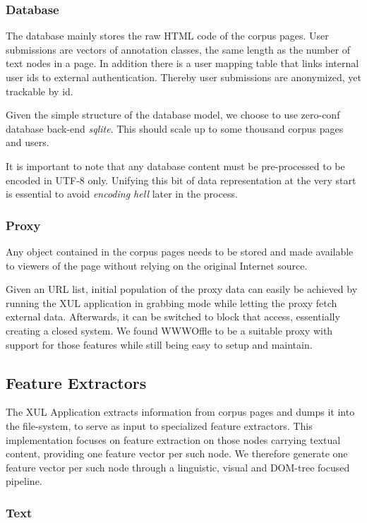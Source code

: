 \subsubsection{Database}

The database mainly stores the raw HTML code of the corpus pages.
User submissions are vectors of annotation classes, the same length as the number of text nodes in a page.
In addition there is a user mapping table that links internal user ids to external authentication.
Thereby user submissions are anonymized, yet trackable by id.

Given the simple structure of the database model, we choose to use zero-conf database back-end \textit{sqlite}.
This should scale up to some thousand corpus pages and users.

It is important to note that any database content must be pre-processed to be encoded in UTF-8 only.
Unifying this bit of data representation at the very start is essential to avoid \textit{encoding hell} later in the process.
\subsubsection{Proxy}

Any object contained in the corpus pages needs to be stored and made available to viewers of the page without relying on the original Internet source.

Given an URL list, initial population of the proxy data can easily be achieved by running the XUL application in grabbing mode while letting the proxy fetch external data.
Afterwards, it can be switched to block that access, essentially creating a closed system.
We found WWWOffle to be a suitable proxy with support for those features while still being easy to setup and maintain.

\subsection{Feature Extractors\label{extract}}

The XUL Application extracts information from corpus pages and dumps it into the file-system, to serve as input to specialized feature extractors.
This implementation focuses on feature extraction on those nodes carrying textual content, providing one feature vector per such node.
We therefore generate one feature vector per such node through a linguistic, visual and DOM-tree focused pipeline.

\subsubsection{Text}

